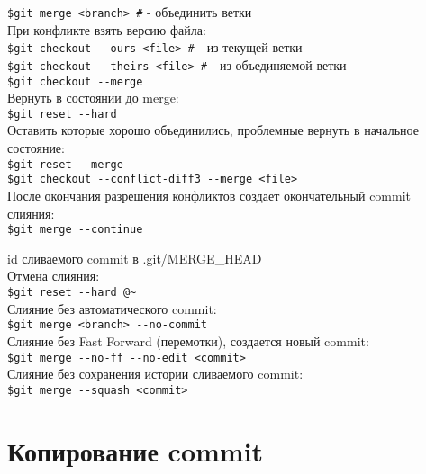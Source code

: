 \documentclass[12pt, a4paper]{article}
\begin{document}
\noindent \texttt{\$git merge <branch> \indent\#} - объединить ветки \\

\noindent При конфликте взять версию файла: \\
\indent \texttt{\$git checkout {-}-ours <file> \indent\#} - из текущей ветки  \\
\indent \texttt{\$git checkout {-}-theirs <file> \indent\#} - из объединяемой ветки \\

\noindent \texttt{\$git checkout {-}-merge} \\

\noindent Вернуть в состоянии до merge: \\
\indent \texttt{\$git reset {-}-hard} \\
\noindent Оставить которые хорошо объединились, проблемные вернуть в начальное состояние: \\
\indent \texttt{\$git reset {-}-merge} \\

\noindent \texttt{\$git checkout {-}-conflict-diff3 {-}-merge <file>} \\

\noindent После окончания разрешения конфликтов создает окончательный commit слияния: \\
\indent \texttt{\$git merge {-}-continue}

\noindent id сливаемого commit в .git/MERGE\_HEAD \\

\noindent Отмена слияния: \\
\indent \texttt{\$git reset {-}-hard {@}\~} \\

\noindent Слияние без автоматического commit: \\
\indent \texttt{\$git merge <branch> {-}-no-commit} \\

\noindent Слияние без Fast Forward (перемотки), создается новый commit: \\
\indent \texttt{\$git merge {-}-no-ff {-}-no-edit <commit>} \\

\noindent Слияние без сохранения истории сливаемого commit: \\
\indent \texttt{\$git merge {-}-squash <commit>} \\





\section{Копирование commit}
\end{document}
